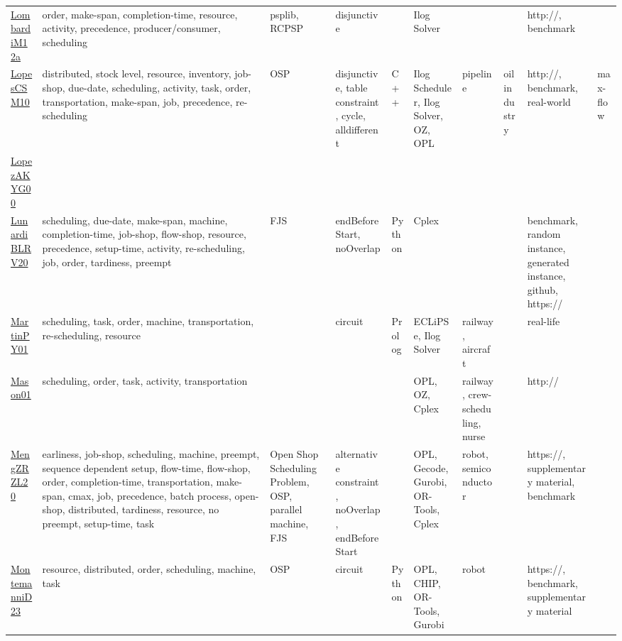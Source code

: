 {\begin{longtable}{p{3cm}p{4cm}p{2cm}p{2cm}p{2cm}p{2cm}p{2cm}p{2cm}p{2cm}p{2cm}}
\href{articles/LombardiM12a.pdf}{LombardiM12a}~\cite{LombardiM12a} & order, make-span, completion-time, resource, activity, precedence, producer/consumer, scheduling & psplib, RCPSP & disjunctive &  & Ilog Solver &  &  & http://, benchmark & \\
\href{articles/LopesCSM10.pdf}{LopesCSM10}~\cite{LopesCSM10} & distributed, stock level, resource, inventory, job-shop, due-date, scheduling, activity, task, order, transportation, make-span, job, precedence, re-scheduling & OSP & disjunctive, table constraint, cycle, alldifferent & C++ & Ilog Scheduler, Ilog Solver, OZ, OPL & pipeline & oil industry & http://, benchmark, real-world & max-flow\\
\href{articles/LopezAKYG00.pdf}{LopezAKYG00}~\cite{LopezAKYG00} &  &  &  &  &  &  &  &  & \\
\href{articles/LunardiBLRV20.pdf}{LunardiBLRV20}~\cite{LunardiBLRV20} & scheduling, due-date, make-span, machine, completion-time, job-shop, flow-shop, resource, precedence, setup-time, activity, re-scheduling, job, order, tardiness, preempt & FJS & endBeforeStart, noOverlap & Python & Cplex &  &  & benchmark, random instance, generated instance, github, https:// & \\
\href{articles/MartinPY01.pdf}{MartinPY01}~\cite{MartinPY01} & scheduling, task, order, machine, transportation, re-scheduling, resource &  & circuit & Prolog & ECLiPSe, Ilog Solver & railway, aircraft &  & real-life & \\
\href{articles/Mason01.pdf}{Mason01}~\cite{Mason01} & scheduling, order, task, activity, transportation &  &  &  & OPL, OZ, Cplex & railway, crew-scheduling, nurse &  & http:// & \\
\href{articles/MengZRZL20.pdf}{MengZRZL20}~\cite{MengZRZL20} & earliness, job-shop, scheduling, machine, preempt, sequence dependent setup, flow-time, flow-shop, order, completion-time, transportation, make-span, cmax, job, precedence, batch process, open-shop, distributed, tardiness, resource, no preempt, setup-time, task & Open Shop Scheduling Problem, OSP, parallel machine, FJS & alternative constraint, noOverlap, endBeforeStart &  & OPL, Gecode, Gurobi, OR-Tools, Cplex & robot, semiconductor &  & https://, supplementary material, benchmark & \\
\href{articles/MontemanniD23.pdf}{MontemanniD23}~\cite{MontemanniD23} & resource, distributed, order, scheduling, machine, task & OSP & circuit & Python & OPL, CHIP, OR-Tools, Gurobi & robot &  & https://, benchmark, supplementary material & \\

\end{longtable}}

